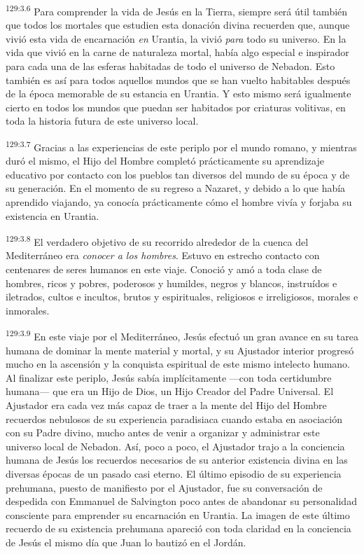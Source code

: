 \par 
\textsuperscript{129:3.6} Para comprender la vida de Jesús en la Tierra, siempre será útil también que todos los mortales que estudien esta donación divina recuerden que, aunque vivió esta vida de encarnación \textit{en} Urantia, la vivió \textit{para} todo su universo. En la vida que vivió en la carne de naturaleza mortal, había algo especial e inspirador para cada una de las esferas habitadas de todo el universo de Nebadon. Esto también es así para todos aquellos mundos que se han vuelto habitables después de la época memorable de su estancia en Urantia. Y esto mismo será igualmente cierto en todos los mundos que puedan ser habitados por criaturas volitivas, en toda la historia futura de este universo local.

\par 
\textsuperscript{129:3.7} Gracias a las experiencias de este periplo por el mundo romano, y mientras duró el mismo, el Hijo del Hombre completó prácticamente su aprendizaje educativo por contacto con los pueblos tan diversos del mundo de su época y de su generación. En el momento de su regreso a Nazaret, y debido a lo que había aprendido viajando, ya conocía prácticamente cómo el hombre vivía y forjaba su existencia en Urantia.

\par 
\textsuperscript{129:3.8} El verdadero objetivo de su recorrido alrededor de la cuenca del Mediterráneo era \textit{conocer a los hombres}. Estuvo en estrecho contacto con centenares de seres humanos en este viaje. Conoció y amó a toda clase de hombres, ricos y pobres, poderosos y humildes, negros y blancos, instruídos e iletrados, cultos e incultos, brutos y espirituales, religiosos e irreligiosos, morales e inmorales.

\par 
\textsuperscript{129:3.9} En este viaje por el Mediterráneo, Jesús efectuó un gran avance en su tarea humana de dominar la mente material y mortal, y su Ajustador interior progresó mucho en la ascensión y la conquista espiritual de este mismo intelecto humano. Al finalizar este periplo, Jesús sabía implícitamente ---con toda certidumbre humana--- que era un Hijo de Dios, un Hijo Creador del Padre Universal. El Ajustador era cada vez más capaz de traer a la mente del Hijo del Hombre recuerdos nebulosos de su experiencia paradisiaca cuando estaba en asociación con su Padre divino, mucho antes de venir a organizar y administrar este universo local de Nebadon. Así, poco a poco, el Ajustador trajo a la conciencia humana de Jesús los recuerdos necesarios de su anterior existencia divina en las diversas épocas de un pasado casi eterno. El último episodio de su experiencia prehumana, puesto de manifiesto por el Ajustador, fue su conversación de despedida con Emmanuel de Salvington poco antes de abandonar su personalidad consciente para emprender su encarnación en Urantia. La imagen de este último recuerdo de su existencia prehumana apareció con toda claridad en la conciencia de Jesús el mismo día que Juan lo bautizó en el Jordán.

